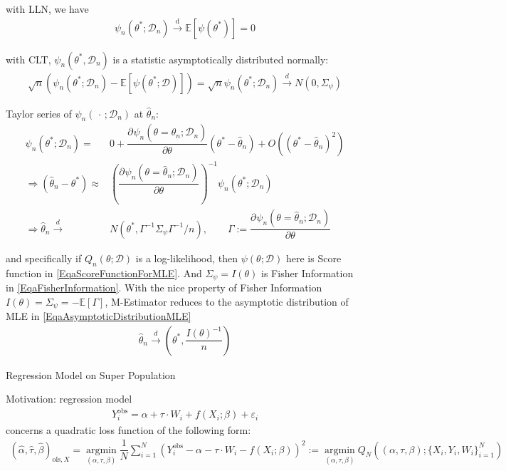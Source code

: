     with LLN, we have
    \begin{align}
        \psi_n(\theta ^*;\mathcal{D}_n)\xrightarrow[]{\mathrm{d} } \mathbb{E}\left[ \psi(\theta ^*) \right] =0  
    \end{align}

    with CLT, $ \psi_n(\theta ^*,\mathcal{D}_n) $ is a statistic asymptotically distributed normally:
    \begin{align}
        \sqrt{n}\left(\psi_n(\theta ^*;\mathcal{D}_n)-\mathbb{E}\left[ \psi(\theta ^*;\mathcal{D}) \right]\right)=\sqrt{n}\psi_n(\theta ^*;\mathcal{D}_n) \xrightarrow[]{d} N(0,\Sigma _{\psi})
    \end{align}

    Taylor series of $ \psi_n(\, \cdot \, ;\mathcal{D}_n) $ at $ \hat{\theta }_n $:
    \begin{align}
        \psi_n(\theta ^*;\mathcal{D}_n)=& 0 + \dfrac{\partial^{} \psi_n(\theta =\hat{\theta}_n;\mathcal{D}_n)}{\partial \theta ^{}}\left(\theta ^*-\hat{\theta }_n\right)+O((\theta ^*-\hat{\theta }_n)^2)\\
        \Rightarrow \left(\hat{\theta }_n-\theta ^*\right)\approx & \left( \dfrac{\partial^{} \psi_n(\theta =\hat{\theta}_n;\mathcal{D}_n)}{\partial \theta ^{}}\right)^{-1}\psi_n(\theta ^*;\mathcal{D}_n)\\
        \Rightarrow \hat{\theta }_n\xrightarrow[]{d} &N(\theta ^*,\Gamma ^{-1}\Sigma _{\psi}\Gamma ^{-1}\big/n ),\qquad \Gamma :=\dfrac{\partial^{} \psi_n(\theta =\hat{\theta}_n;\mathcal{D}_n)}{\partial \theta ^{}}
    \end{align}

    and specifically if $ Q_n(\theta ;\mathcal{D}) $ is a log-likelihood, then $ \psi(\theta ;\mathcal{D}) $ here is Score function in \autoref{EqaScoreFunctionForMLE}. And $ \Sigma _\psi=I(\theta )  $ is Fisher Information in \autoref{EqaFisherInformation}. With the nice property of Fisher Information $ I(\theta )=\Sigma _{\psi}=-\mathbb{E}\left[ \Gamma  \right]  $, M-Estimator reduces to the asymptotic distribution of MLE in \autoref{EqaAsymptoticDistributionMLE}
    \begin{align}
         \hat{\theta }_n\xrightarrow[]{d} (\theta ^*,\dfrac{ I(\theta )^{-1}}{n})
    \end{align}
    
\begin{point}
    Regression Model on Super Population
\end{point}

Motivation: regression model
\begin{align}
    Y_i^\mathrm{obs}=\alpha +\tau\cdot W_i + f(X_i;\beta )+\varepsilon _i  
\end{align}
concerns a quadratic loss function of the following form:
\begin{align}
    (\hat{\alpha },\hat{\tau},\hat{\beta })_{\mathrm{ols},X}=\mathop{\arg\min}\limits_{(\alpha ,\tau,\beta )} \dfrac{1}{N}\sum_{i=1}^N\left( Y^\mathrm{obs}_i-\alpha-\tau\cdot W_i - f(X_i;\beta )\right)^2 := \mathop{\arg\min}\limits_{(\alpha ,\tau,\beta )}Q_N\left((\alpha ,\tau,\beta );\{X_i,Y_i,W_i\}_{i=1}^N\right)
\end{align}

